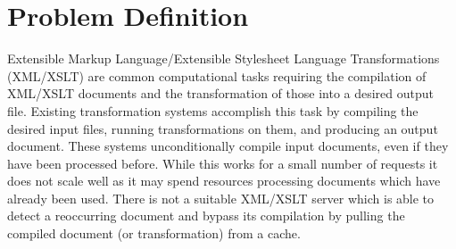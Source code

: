 % 
% 
\section*{Problem Definition}

Extensible Markup Language/Extensible Stylesheet Language Transformations (XML/XSLT) are common computational tasks requiring the compilation of XML/XSLT documents and the transformation of those into a desired output file.
Existing transformation systems accomplish this task by compiling the desired input files, running transformations on them, and producing an output document.
These systems unconditionally compile input documents, even if they have been processed before.
While this works for a small number of requests it does not scale well as it may spend resources processing documents which have already been used.
There is not a suitable XML/XSLT server which is able to detect a reoccurring document and bypass its compilation by pulling the compiled document (or transformation) from a cache.

